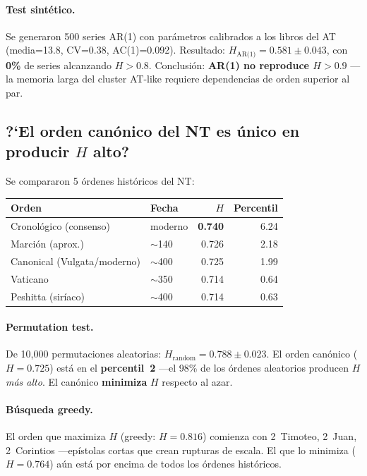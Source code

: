 \documentclass[12pt,a4paper]{article}
\newcommand{\val}[1]{\textcolor{hlcolor}{\textbf{#1}}}
\begin{document}
\paragraph{Test sint\'etico.}
Se generaron 500 series AR(1) con par\'ametros calibrados a los libros del AT
(media=13.8, CV=0.38, AC(1)=0.092). Resultado:
$H_{\text{AR(1)}} = 0.581 \pm 0.043$, con \textbf{0\%} de series alcanzando $H > 0.8$.
Conclusi\'on: \textbf{AR(1) no reproduce $H > 0.9$} ---la memoria larga del cluster AT-like
requiere dependencias de orden superior al par.

\subsection{?`El orden can\'onico del NT es \'unico en producir $H$ alto?}

Se compararon 5 \'ordenes hist\'oricos del NT:

\begin{center}\small
\begin{tabular}{llrr}
\toprule
Orden & Fecha & $H$ & Percentil \\
\midrule
Cronol\'ogico (consenso)      & moderno     & \val{0.740} & 6.24 \\
Marci\'on (aprox.)            & $\sim$140   & 0.726 & 2.18 \\
Canonical (Vulgata/moderno)   & $\sim$400   & 0.725 & 1.99 \\
Vaticano                      & $\sim$350   & 0.714 & 0.64 \\
Peshitta (sir\'iaco)          & $\sim$400   & 0.714 & 0.63 \\
\bottomrule
\end{tabular}
\end{center}

\paragraph{Permutation test.}
De 10,000 permutaciones aleatorias: $H_{\text{random}} = 0.788 \pm 0.023$.
El orden can\'onico ($H = 0.725$) est\'a en el \textbf{percentil~2}
---el 98\% de los \'ordenes aleatorios producen $H$ \emph{m\'as alto}.
El can\'onico \textbf{minimiza} $H$ respecto al azar.

\paragraph{B\'usqueda greedy.}
El orden que maximiza $H$ (greedy: $H = 0.816$) comienza con 2~Timoteo,
2~Juan, 2~Corintios ---ep\'istolas cortas que crean rupturas de escala.
El que lo minimiza ($H = 0.764$) a\'un est\'a por encima de todos los
\'ordenes hist\'oricos.
\end{document}
